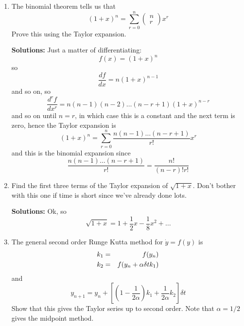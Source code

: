 \documentclass[12pt]{article}
\begin{document}
\begin{enumerate}
\item The binomial theorem tells us that
\begin{equation}
(1+x)^n=\sum_{r=0}^n \left(\begin{array}{c}n\\r\end{array}\right)x^r
\end{equation}
Prove this using the Taylor expansion.

\textbf{Solutions: } Just a matter of differentiating:
\begin{equation}
f(x)=(1+x)^n
\end{equation}
so 
\begin{equation}
\frac{df}{dx}=n(1+x)^{n-1}
\end{equation}
and so on, so
\begin{equation}
\frac{d^rf}{dx^r}=n(n-1)(n-2)\ldots(n-r+1)(1+x)^{n-r}
\end{equation}
and so on until $n=r$, in which case this is a constant and the next
term is zero, hence the Taylor expansion is
\begin{equation}
(1+x)^n=\sum_{r=0}^n\frac{n(n-1)\ldots(n-r+1)}{r!}x^r
\end{equation}
and this is the binomial expansion since
\begin{equation}
\frac{n(n-1)\ldots(n-r+1)}{r!}=\frac{n!}{(n-r)!r!}
\end{equation}

\item Find the first three terms of the Taylor expansion of $\sqrt{1+x}$. Don't bother with this one if time is short since we've already done lots.

\textbf{Solutions: } Ok, so
\begin{equation}
\sqrt{1+x}=1+\frac{1}{2}x-\frac{1}{8}x^2+\ldots
\end{equation}

\item The general second order Runge Kutta method for $\dot{y}=f(y)$ is
\begin{eqnarray}
k_1&=&f(y_n)\cr
k_2&=&f(y_n+\alpha \delta t k_1)
\end{eqnarray}
and
\begin{equation}
y_{n+1}=y_n+\left[\left(1-\frac{1}{2\alpha}\right)k_1+\frac{1}{2\alpha}k_2\right]\delta t
\end{equation}
Show that this gives the Taylor series up to second order. Note that
$\alpha=1/2$ gives the midpoint method.


\end{enumerate}
\end{document}
